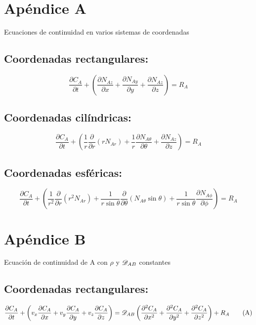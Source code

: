 \section*{Apéndice A}
Ecuaciones de continuidad en varios sistemas de coordenadas

\subsection*{Coordenadas rectangulares:}
\begin{equation} \frac{\partial C_A}{\partial t} + \left( \frac{\partial N_{Az}}{\partial x} + \frac{\partial N_{Ay}}{\partial y} + \frac{\partial N_{Az}}{\partial z} \right) = R_A \tag{A}
\end{equation}

\subsection*{Coordenadas cilíndricas:}
\begin{equation} \frac{\partial C_A}{\partial t} + \left( \frac{1}{r} \frac{\partial}{\partial r} (rN_{Ar}) + \frac{1}{r} \frac{\partial N_{A\theta}}{\partial \theta} + \frac{\partial N_{Az}}{\partial z} \right) = R_A \tag{B} 
\end{equation}

\subsection*{Coordenadas esféricas:}
\begin{equation} \frac{\partial C_A}{\partial t} + \left( \frac{1}{r^2} \frac{\partial}{\partial r} (r^2 N_{Ar}) + \frac{1}{r \sin \theta} \frac{\partial}{\partial \theta} (N_{A\theta} \sin \theta) + \frac{1}{r \sin \theta} \frac{\partial N_{A\phi}}{\partial \phi} \right) = R_A \tag{C}
\end{equation}

\newpage
\section*{Apéndice B}
Ecuación de continuidad de A con $\rho$ y $\mathcal\mathscr\mathscr{D}_{AB}$ constantes
\subsection*{Coordenadas rectangulares:}
\begin{equation}  \frac{\partial C_A}{\partial t} + \left( v_x \frac{\partial C_A}{\partial x} + v_y \frac{\partial C_A}{\partial y} + v_z \frac{\partial C_A}{\partial z} \right) = \mathscr\mathscr\mathscr{D}_{AB} \left( \frac{\partial^2 C_A}{\partial x^2} + \frac{\partial^2 C_A}{\partial y^2} + \frac{\partial^2 C_A}{\partial z^2} \right) + R_A \tag{A}
\end{equation}

